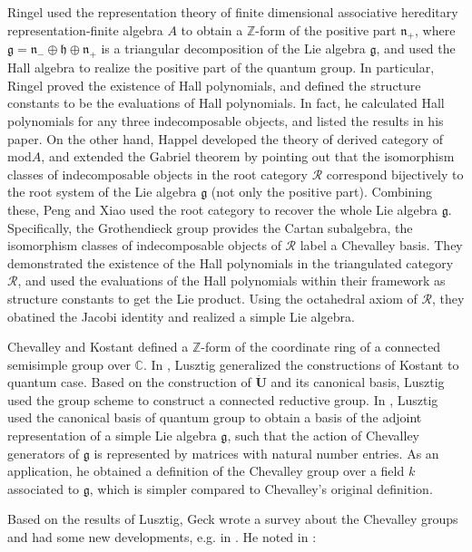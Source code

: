 \documentclass[12pt]{amsart}
\begin{document}
Ringel\cite{Ringel1990}\cite{RINGEL1990137} used the representation theory of finite dimensional associative hereditary representation-finite algebra $A$ to obtain a $\mathbb{Z}$-form of the positive part $\mathfrak{n}_+$, where $\mathfrak{g}=\mathfrak{n}_-\oplus \mathfrak{h} \oplus \mathfrak{n}_+$ is a triangular decomposition of the Lie algebra $\mathfrak{g}$, and used the Hall algebra to realize the positive part of the quantum group.
In particular, Ringel proved the existence of Hall polynomials, and defined the structure constants to be the evaluations of Hall polynomials.
In fact, he calculated Hall polynomials for any three indecomposable objects, and listed the results in his paper\cite{RINGEL1990137}.
On the other hand, Happel\cite{Happel}\cite{Happelbook} developed the theory of derived category of mod$A$, and extended the Gabriel theorem by pointing out that the isomorphism classes of indecomposable objects in the root category $\mathcal{R}$ correspond bijectively to the root system of the Lie algebra $\mathfrak{g}$ (not only the positive part).
Combining these, Peng and Xiao\cite{1997ROOT} used the root category to recover the whole Lie algebra $\mathfrak{g}$.
Specifically, the Grothendieck group provides the Cartan subalgebra, the isomorphism classes of indecomposable objects of $\mathcal{R}$ label a Chevalley basis.
They demonstrated the existence of the Hall polynomials in the triangulated category $\mathcal{R}$, and used the evaluations of the Hall polynomials within their framework as structure constants to get the Lie product. 
Using the octahedral axiom of $\mathcal{R}$, they obatined the Jacobi identity and realized a simple Lie algebra.

Chevalley\cite{C2} and Kostant\cite{Kostant} defined a $\mathbb{Z}$-form of the coordinate ring of a connected semisimple group over $\mathbb{C}$.
In \cite{zform}, Lusztig generalized the constructions of Kostant to quantum case. 
Based on the construction of $\dot{\mathbf{U} }$ and its canonical basis, Lusztig used the group scheme to construct a connected reductive group.
In \cite{Lusztig}, Lusztig used the canonical basis of quantum group to obtain a basis of the adjoint representation of a simple Lie algebra $\mathfrak{g}$, such that the action of Chevalley generators of $\mathfrak{g}$ is represented by matrices with natural number entries. 
As an application, he obtained a definition of the Chevalley group over a field $k$ associated to $\mathfrak{g}$, which is simpler compared to Chevalley's original definition.

Based on the results of Lusztig, Geck wrote a survey\cite{gecknotes} about the Chevalley groups and had some new developments, e.g. in \cite{Geck}. 
He noted in \cite{Geck}:
\end{document}

